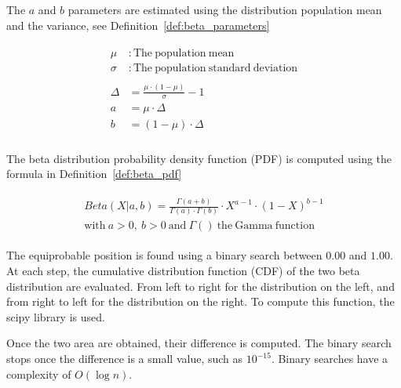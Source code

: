 The $a$ and $b$ parameters are estimated using the distribution population mean and the variance, see Definition~\ref{def:beta_parameters}

\begin{definition}
  \begin{gather*}
    \begin{aligned}
      \mu&: \mathrm{The\ population\ mean} \\
      \sigma&: \mathrm{The\ population\ standard\ deviation} \\
       \\
      \Delta &= \frac{\mu \cdot (1 - \mu)}{\sigma} - 1 \\
      a &= \mu \cdot \Delta \\
      b &= (1 - \mu) \cdot \Delta \\
    \end{aligned}
  \end{gather*}
\end{definition}

The beta distribution probability density function (PDF) is computed using the formula in Definition~\ref{def:beta_pdf}

\begin{definition}
  \begin{gather*}
    \begin{aligned}
      Beta(X|a,b) = \frac{\Gamma(a + b)}{\Gamma(a) \cdot \Gamma(b)} \cdot X^{a-1} \cdot (1 - X)^{b-1}\\
      \mathrm{with\ }a > 0\mathrm{,\ }b > 0\mathrm{\ and\ }\Gamma()\mathrm{\ the\ Gamma\ function}
    \end{aligned}
  \end{gather*}
\end{definition}

The equiprobable position is found using a binary search between $0.00$ and $1.00$.
At each step, the cumulative distribution function (CDF) of the two beta distribution are evaluated.
From left to right for the distribution on the left, and from right to left for the distribution on the right.
To compute this function, the scipy library is used.

Once the two area are obtained, their difference is computed.
The binary search stops once the difference is a small value, such as $10^{-15}$.
Binary searches have a complexity of $O(\log n)$.

